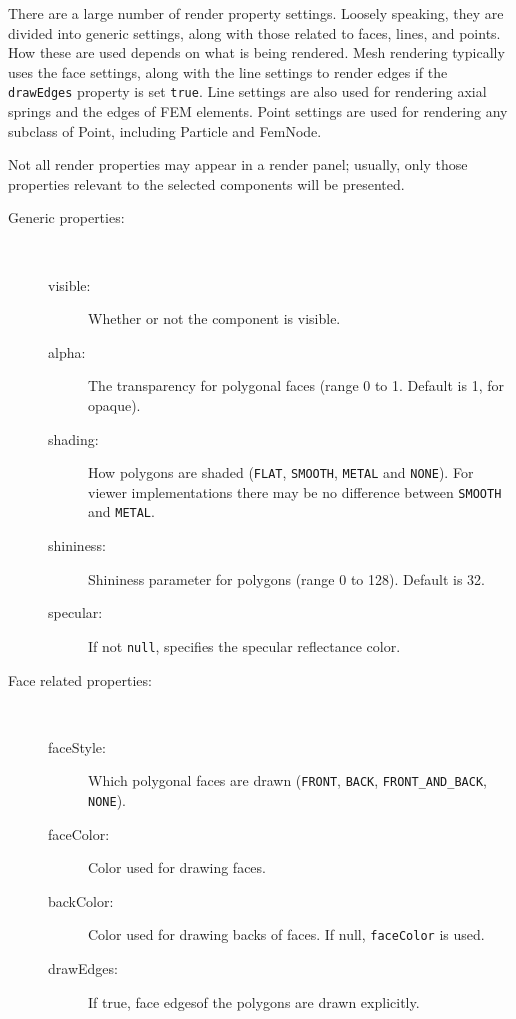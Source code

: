 \documentclass{article}
\begin{document}
There are a large number of render property settings. Loosely
speaking, they are divided into generic settings, along with those
related to faces, lines, and points. How these are used depends on
what is being rendered. Mesh rendering typically uses the face
settings, along with the line settings to render edges if the
{\tt drawEdges} property is set {\tt true}.  Line settings are also used for
rendering axial springs and the edges of FEM elements.  Point settings
are used for rendering any subclass of Point, including Particle and
FemNode. 

Not all render properties may appear in a render panel; usually, only
those properties relevant to the selected components will be
presented.

\begin{description}

\item[Generic properties:]
\hfil \\
\begin{description}
\item[visible:]
Whether or not the component is visible.
\item[alpha:]
The transparency for polygonal faces (range 0 to 1. Default is 1, for
opaque).
\item[shading:] 
How polygons are shaded ({\tt FLAT}, {\tt SMOOTH},
{\tt METAL} and {\tt NONE}).  For viewer implementations there may be no
difference between {\tt SMOOTH} and {\tt METAL}.
\item[shininess:]
Shininess parameter for polygons (range 0 to 128). Default is 32.
\item[specular:]
If not {\tt null}, specifies the specular reflectance color.
\end{description}

\item[Face related properties:]
\hfil \\
\begin{description}
\item[faceStyle:]
Which polygonal faces are drawn ({\tt FRONT}, {\tt BACK},
{\tt FRONT\_AND\_BACK}, {\tt NONE}).
\item[faceColor:] 
Color used for drawing faces.
\item[backColor:]
Color used for drawing backs of faces. If null, {\tt faceColor} is used.
\item[drawEdges:] 	
If true, face edgesof the polygons are drawn explicitly.
\end{description}


\end{description}
\end{document}
